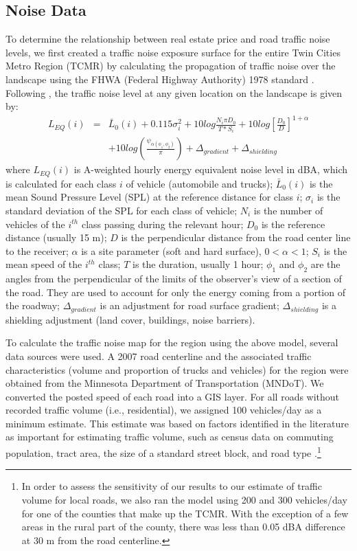 \documentclass{article}\usepackage{graphicx, color}
\begin{document}
\subsection{Noise Data}
To determine the relationship between real estate price and road traffic noise levels, we first created a traffic noise exposure surface for the entire Twin Cities Metro Region (TCMR) by calculating the propagation of traffic noise over the landscape using the FHWA (Federal Highway Authority) 1978 standard \citep{Barry1978}. Following \citet{Barry1978}, the traffic noise level at any given location on the landscape is given by: 
\begin{eqnarray}\label{eq:noise}
L_{EQ}(i) &=& \bar{L}_0(i) + 0.115 \sigma _i^2 + 10 log \frac{N_i \pi D_0}{T*S_i} + 10 log \left[ \frac{D_0}{D}\right]^{1 + \alpha}  \nonumber \\
&& + 10 log \left( \frac{\psi _{\alpha (\phi _1, \phi _2)}}{\pi}\right) + \Delta _{gradient} + \Delta _{shielding}
\end{eqnarray}
where $L_{EQ}(i)$ is A-weighted hourly energy equivalent noise level in dBA, which is calculated for each class $i$ of vehicle (automobile and trucks); $\bar{L}_0(i)$ is the mean Sound Pressure Level (SPL) at the reference distance for class $i$; $\sigma _i$ is the standard deviation of the SPL for each class of vehicle; $N_i$ is the number of vehicles of the $i^{th}$ class passing during the relevant hour; $D_0$ is the reference distance (usually 15 m); $D$ is the perpendicular distance from the road center line to the receiver; $\alpha$ is a site parameter (soft and hard surface), $0 < \alpha < 1$; $S_i$ is the mean speed of the $i^{th}$ class; $T$ is the duration, usually 1 hour; $\phi _1$ and $\phi _2$ are the angles from the perpendicular of the limits of the observer's view of a section of the road. They are used to account for only the energy coming from a portion of the roadway; $\Delta _{gradient}$ is an adjustment for road surface gradient; $\Delta _{shielding}$ is a shielding adjustment (land cover, buildings, noise barriers).

To calculate the traffic noise map for the region using the above model, several data sources were used. A 2007 road centerline and the associated traffic characteristics (volume and proportion of trucks and vehicles) for the region were obtained from the Minnesota Department of Transportation (MNDoT). We converted the posted speed of each road into a GIS layer. For all roads without recorded traffic volume (i.e., residential), we assigned 100 vehicles/day as a minimum estimate. This estimate was based on factors identified in the literature as important for estimating traffic volume, such as census data on commuting population, tract area, the size of a standard street block, and road type \citep{Cheng1992, Fricker1986}.\footnote{In order to assess the sensitivity of our results to our estimate of traffic volume for local roads, we also ran the model using 200 and 300 vehicles/day for one of the counties that make up the TCMR. With the exception of a few areas in the rural part of the county, there was less than 0.05 dBA difference at 30 m from the road centerline.}
\end{document}
